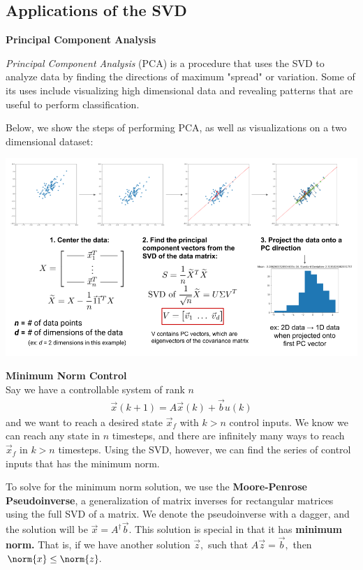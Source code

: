 \renewcommand{\arraystretch}{1.25}

\subsection*{Applications of the SVD}
\textbf{Principal Component Analysis}

\textit{Principal Component Analysis} (PCA) is a procedure that uses the SVD to analyze data by finding the directions of maximum "spread" or variation. Some of its uses include visualizing high dimensional data and revealing patterns that are useful to perform classification.

Below, we show the steps of performing PCA, as well as visualizations on a two dimensional dataset:

\includegraphics[width=\textwidth]{figures/pca-steps}

\textbf{Minimum Norm Control} \\
\newline
Say we have a controllable system of rank $n$
\begin{align*}
    \vec{x}(k + 1) = A\vec{x}(k) + \vec{b}u(k)
\end{align*}
 and we want to reach a desired state $\vec{x}_f$ with $k > n$ control inputs. We know we can reach any state in $n$ timesteps, and there are infinitely many ways to reach $\vec{x}_f$ in $k > n$ timesteps. Using the SVD, however, we can find the series of control inputs that has the minimum norm.

To solve for the minimum norm solution, we use the \textbf{Moore-Penrose Pseudoinverse}, a generalization of matrix inverses for rectangular matrices using the full SVD of a matrix. We denote the pseudoinverse with a dagger, and the solution will be $\vec{x} = A^{\dagger} \vec{b}.$
This solution is special in that it has \textbf{minimum norm.} That is, if we have another solution $\vec{z},$ such that $A \vec{z} = \vec{b},$ then $\norm{x} \leq \norm{z}.$

